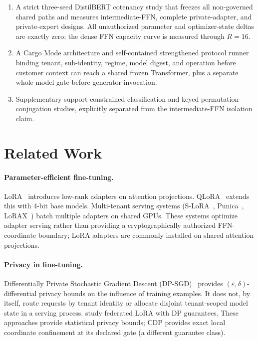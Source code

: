 \documentclass[11pt,a4paper]{article}
\newcommand{\bW}{\mathbf{W}}
\begin{document}
\begin{enumerate}[nosep]
    \emph{activation $\to$ gate $\to\bW_2$} ordering and showing why
    pre-gate LayerNorm invalidates $\bW_1$ confinement.  The narrower
    pre-MLP placement is specified separately so its input-coordinate
    and first-projection guarantee is not confused with the
    intermediate theorem.
    \item A strict three-seed DistilBERT cotenancy study that freezes
    all non-governed shared paths and measures intermediate-FFN,
    complete private-adapter, and private-expert designs.  All
    unauthorized parameter and optimizer-state deltas are exactly
    zero; the dense FFN capacity curve is measured through $R{=}16$.
    \item A Cargo Mode architecture and self-contained strengthened
    protocol runner binding tenant, sub-identity, regime, model digest,
    and operation before customer context can reach a shared frozen
    Transformer, plus a separate whole-model gate before generator
    invocation.
    \item Supplementary support-constrained classification and keyed
    permutation-conjugation studies, explicitly separated from the
    intermediate-FFN isolation claim.
\end{enumerate}

\section{Related Work}
\label{sec:related}

\paragraph{Parameter-efficient fine-tuning.}
LoRA~\citep{hu2022lora} introduces low-rank adapters on attention
projections.  QLoRA~\citep{dettmers2024qlora} extends this with
4-bit base models.  Multi-tenant serving systems
(S-LoRA~\citep{sheng2024slora}, Punica~\citep{chen2023punica},
LoRAX~\citep{predibase2024lorax}) batch multiple adapters
on shared GPUs.  These systems optimize adapter serving rather than
providing a cryptographically authorized FFN-coordinate boundary;
LoRA adapters are commonly installed on shared attention
projections.

\paragraph{Privacy in fine-tuning.}
Differentially Private Stochastic Gradient Descent (DP-SGD)~\citep{abadi2016deep} provides $(\varepsilon,\delta)$-differential
privacy bounds on the influence of training examples.  It does not,
by itself, route requests by tenant identity or allocate disjoint
tenant-scoped model state in a serving process.
\citet{wang2023dpfederated} study federated LoRA with DP
guarantees.  These approaches provide statistical privacy
bounds; CDP provides exact local coordinate confinement at its
declared gate (a different guarantee class).
\end{document}
